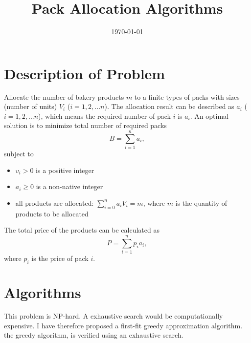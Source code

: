 \documentclass[a4paper]{article}
\begin{document}
\title{\Huge Pack Allocation Algorithms}


\date{\today}


\maketitle

\label{firstpage}
\section{Description of Problem}

Allocate the number of bakery products $m$ to a finite types of packs with sizes
(number of units) $V_i$ ($i=1, 2, ... n$). The allocation result can be described as $a_i$ ($i=1, 2, ... n$), which means the required number of pack $i$ is $a_i$.  An optimal solution is to minimize total number of required packs
$$B = \sum_{i=1}^n a_i,$$
subject to
\begin{itemize}
   \item $v_i > 0$ is a positive integer
   \item $a_i \geq 0$ is a non-native integer
   \item all products are allocated: $\sum_{i=0}^n a_i V_i = m$, where $m$ is the quantity of products to be allocated
\end{itemize}
The total price of the products can be calculated as
$$P = \sum_{i=1}^n p_i a_i,$$ where $p_i$ is the price of pack $i$.
\section{Algorithms}
This problem is NP-hard. A exhaustive search would be computationally expensive. I have therefore proposed a first-fit greedy approximation algorithm. the greedy algorithm, is verified using an exhaustive search.
\end{document}
